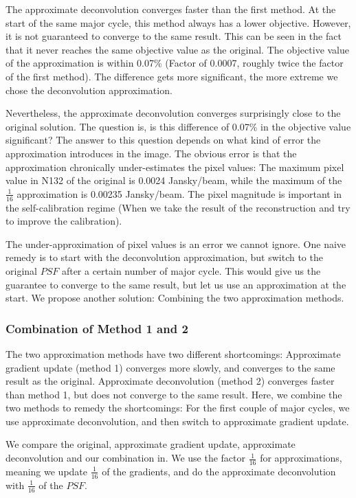The approximate deconvolution converges faster than the first method. At the start of the same major cycle, this method always has a lower objective. However, it is not guaranteed to converge to the same result. This can be seen in the fact that it never reaches the same objective value as the original. The objective value of the approximation is within 0.07\% (Factor of 0.0007, roughly twice the factor of the first method). The difference gets more significant, the more extreme we chose the deconvolution approximation.

Nevertheless, the approximate deconvolution converges surprisingly close to the original solution. The question is, is this difference of 0.07\% in the objective value significant? The answer to this question depends on what kind of error the approximation introduces in the image. The obvious error is that the approximation chronically under-estimates the pixel values: The maximum pixel value in N132 of the original is 0.0024 Jansky/beam, while the maximum of the $\frac{1}{16}$ approximation is 0.00235 Jansky/beam. The pixel magnitude is important in the self-calibration regime \cite{offringa2017optimized} (When we take the result of the reconstruction and try to improve the calibration).

The under-approximation of pixel values is an error we cannot ignore. One naive remedy is to start with the deconvolution approximation, but switch to the original $PSF$ after a certain number of major cycle. This would give us the guarantee to converge to the same result, but let us use an approximation at the start. We propose another solution: Combining the two approximation methods.


\subsubsection{Combination of Method 1 and 2}\label{results:gradients:comparison}
The two approximation methods have two different shortcomings: Approximate gradient update (method 1) converges more slowly, and converges to the same result as the original. Approximate deconvolution (method 2) converges faster than method 1, but does not converge to the same result. Here, we combine the two methods to remedy the shortcomings: For the first couple of major cycles, we use approximate deconvolution, and then switch to approximate gradient update.

We compare the original, approximate gradient update, approximate deconvolution and our combination in. We use the factor $\frac{1}{16}$ for approximations, meaning we update $\frac{1}{16}$ of the gradients, and do the approximate deconvolution with $\frac{1}{16}$ of the $PSF$.

